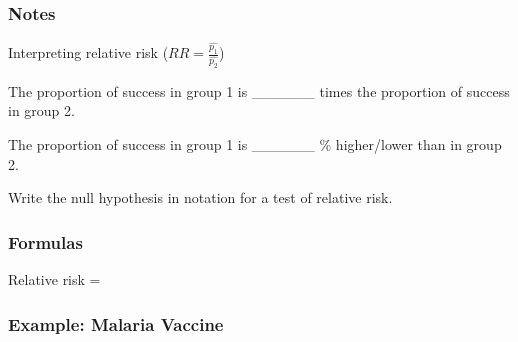 \documentclass[
]{report}
\newcommand{\rgs}{\vspace{12pt}} %
\newcommand{\rgi}{\hspace{24pt}}  %
\begin{document}
\hypertarget{notes-7}{%
\subsubsection*{Notes}\label{notes-7}}

Interpreting relative risk (\(RR = \frac{\hat{p_1}}{\hat{p_2}}\))

\rgi The proportion of success in group 1 is \_\_\_\_\_\_ times the proportion of success in group 2.

\rgi The proportion of success in group 1 is \_\_\_\_\_\_ \% higher/lower than in group 2.

Write the null hypothesis in notation for a test of relative risk.
\rgs

\hypertarget{formulas-5}{%
\subsubsection*{Formulas}\label{formulas-5}}

Relative risk =
\rgs

\hypertarget{example-malaria-vaccine}{%
\subsubsection*{Example: Malaria Vaccine}\label{example-malaria-vaccine}}
\end{document}
